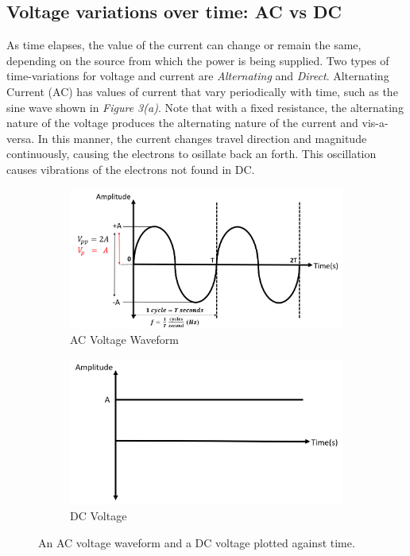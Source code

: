 \documentclass[12pt]{article}
\begin{document}
\subsection{Voltage variations over time: AC vs DC}

As time elapses, the value of the current can change or remain the same, depending on the source from which the power is being supplied. Two types of time-variations for voltage and current are \textit{Alternating} and \textit{Direct}. Alternating Current (AC) has values of current that vary periodically with time, such as the sine wave  shown in \textit{Figure 3(a)}.  Note that with a fixed resistance, the alternating nature of the voltage produces the alternating nature of the current and vis-a-versa. In this manner, the current changes travel direction and magnitude continuously, causing the electrons to osillate back an forth. This oscillation causes vibrations of the electrons not found in DC.

\begin{figure}[h]
\begin{subfigure}{.5\textwidth}
  \includegraphics[width=1\linewidth]{photos/prelim/AC.png}
  \caption{AC Voltage Waveform}
\end{subfigure}%
\begin{subfigure}{.5\textwidth}
  \centering
  \includegraphics[width=1\linewidth]{photos/prelim/DC.png}
  \caption{DC Voltage}
\end{subfigure}
\caption{An AC voltage waveform and a DC voltage plotted against time.}
\end{figure}
\end{document}
